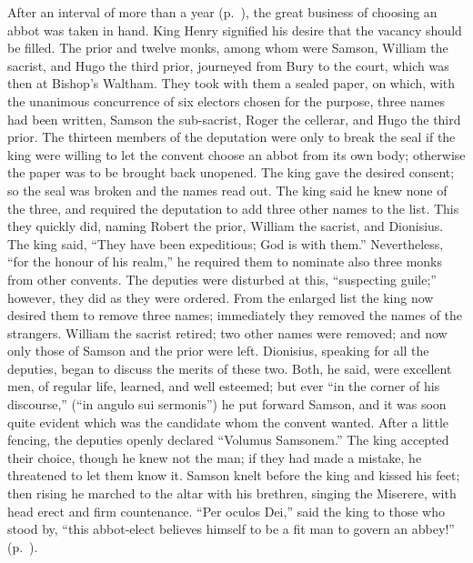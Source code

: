 \documentclass[10pt]{book}
\begin{document}
{After an interval of more than a year (p.\ ), the great business of choosing an abbot was taken in hand. King Henry signified his desire that the vacancy should be filled. The prior and twelve monks, among whom were Samson, William the sacrist, and Hugo the third prior, journeyed from Bury to the court, which was then at Bishop's Waltham. They took with them a sealed paper, on which, with the unanimous concurrence of six electors chosen for the purpose, three names had been written, Samson the sub-sacrist, Roger the cellerar, and Hugo the third prior. The thirteen members of the deputation were only to break the seal if the king were willing to let the convent choose an abbot from its own body; otherwise the paper was to be brought back unopened. The king gave the desired consent; so the seal was broken and the names read out. The king said he knew none of the three, and required the deputation to add three other names to the list. This they quickly did, naming Robert the prior, William the sacrist, and Dionisius. The king said, ``They have been expeditious; God is with them.'' Nevertheless, ``for the honour of his realm,'' he required them to nominate also three monks from other convents. The deputies were disturbed at this, ``suspecting guile;'' however, they did as they were ordered. From the enlarged list the king now desired them to remove three names; immediately they removed the names of the strangers. William the sacrist retired; two other names were removed; and now only those of Samson and the prior were left. Dionisius, speaking for all the deputies, began to discuss the merits of these two. Both, he said, were excellent men, of regular life, learned, and well esteemed; but ever ``in the corner of his discourse,'' (``in angulo sui sermonis'') he put forward Samson, and it was soon quite evident which was the candidate whom the convent wanted. After a little fencing, the deputies openly declared ``Volumus Samsonem.'' The king accepted their choice, though he knew not the man; if they had made a mistake, he threatened to let them know it. Samson knelt before the king and kissed his feet; then rising he marched to the altar with his brethren, singing the Miserere, with head erect and firm countenance. ``Per oculos Dei,'' said the king to those who stood by, ``this abbot-elect believes himself to be a fit man to govern an abbey!'' (p.\ ).

}
\end{document}
